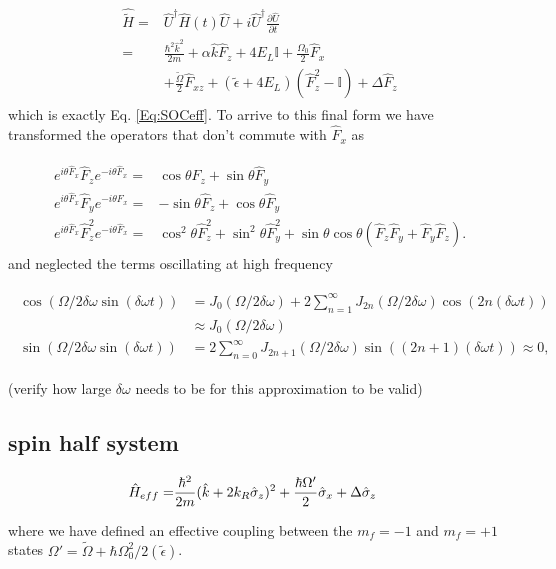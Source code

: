 \begin{align}
	\begin{split}
		\hat{\tilde{H}} = & \hat{U}^{\dagger}\hat{H}(t)\hat{U} + i\hat{U}^{\dagger} \frac{\partial\hat{U}}{\partial t} \\
		 = &\frac{\hbar^2\hat{k}^2}{2m} + \alpha\hat{k}\hat{F}_z +4E_L\mathbb{I} + \frac{\Omega_0}{2}\hat{F}_x \\
		&+ \frac{\tilde{\Omega}}{2}\hat{F}_{xz} +(\tilde{\epsilon}+4E_L)(\hat{F}_z^2-\mathbb{I}) +\Delta\hat{F}_z 	
	\end{split}
\end{align}
%
%
which is exactly Eq. \ref{Eq:SOCeff}. To arrive to this final form we have transformed the operators that don't commute with $\hat{F}_x$ as

%
\begin{align}
	\begin{split}
		e^{i\theta \hat{F}_x} \hat{F}_z e^{-i\theta \hat{F}_x}=& \cos\theta \hat{F}_z + \sin\theta\hat{F}_y \\
		e^{i\theta \hat{F}_x} \hat{F}_y e^{-i\theta \hat{F}_x} =& -\sin\theta\hat{F}_z +\cos\theta\hat{F}_y \\
		e^{i\theta \hat{F}_x} \hat{F}_z^2 e^{-i\theta \hat{F}_x} = &\cos^2\theta\hat{F}_z^2+\sin^2\theta\hat{F}_y^2 + \sin\theta\cos\theta(\hat{F}_z\hat{F}_y + \hat{F}_y\hat{F}_z).
	\end{split}
\end{align}
%
and neglected the terms oscillating at high frequency

\begin{align}
	\begin{split}
	\cos(\Omega/2\delta\omega\sin(\delta\omega t))&= J_0(\Omega/2\delta\omega) + 2\sum_{n=1}^{\infty}J_{2n}(\Omega/2\delta\omega)\cos(2n(\delta\omega t)) \\
	& \approx J_0(\Omega/2\delta\omega) \\
	\sin(\Omega/2\delta\omega\sin(\delta\omega t))&= 2\sum_{n=0}^{\infty}J_{2n+1}(\Omega/2\delta\omega)\sin((2n+1)(\delta\omega t)) \approx 0,
	\end{split}
\end{align} 


(verify how large $\delta\omega$ needs to be for this approximation to be valid)
%
%
 
\subsection{spin half system}
\begin{align}
\begin{split}
\hat{H}_{eff} = & \frac{\hbar^2}{2m}(\hat{k}+2{{k_R}}\hat{\sigma}_z)^2 + \frac{\hbar\Omega'}{2}\hat{\sigma}_x  +\Delta\hat{\sigma}_z  
\label{Eq:SOChalf}
\end{split}
\end{align}	

where we have defined an effective coupling between the $m_f=-1$ and $m_f=+1$ states $\Omega'=\tilde{\Omega}+\hbar\Omega_0^2/2(\tilde{\epsilon})$. 




